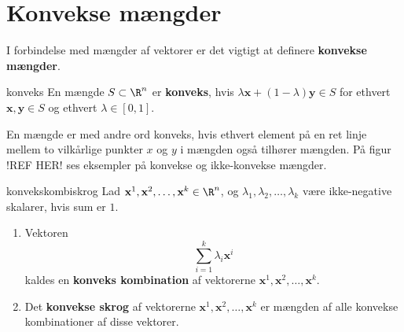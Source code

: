 \section{Konvekse mængder}
%
I forbindelse med mængder af vektorer er det vigtigt at definere \textbf{konvekse mængder}.
\begin{defn}{}{konveks}
En mængde $S \subset \R^n$ er \textbf{konveks}, hvis $\lambda \textbf{x} + (1- \lambda ) \textbf{y} \in S$ for ethvert $\textbf{x}, \textbf{y} \in S$ og ethvert $\lambda \in [0,1]$. 
\end{defn}
\noindent
%
En mængde er med andre ord konveks, hvis ethvert element på en ret linje mellem to vilkårlige punkter $x$ og $y$ i mængden også tilhører mængden. 
På figur !REF HER! ses eksempler på konvekse og ikke-konvekse mængder. 
%
\begin{figure}[h!]
  \centering
  \caption{}
  \label{fig:konveks}
\end{figure}
%
\begin{defn}{}{konvekskombiskrog}
Lad $\textbf{x}^1, \textbf{x}^2, \ldots, \textbf{x}^k \in \R^n$, og $\lambda_1, \lambda_2, \ldots, \lambda_k$ være ikke-negative skalarer, hvis sum er $1$. 
\begin{enumerate}[label=(\alph*)]
	\item Vektoren $$\sum_{i=1}^{k} \lambda_i \textbf{x}^i$$ kaldes en \textbf{konveks kombination} af vektorerne $\textbf{x}^1, \textbf{x}^2, \ldots, \textbf{x}^k$. 
	\item Det \textbf{konvekse skrog} af vektorerne $\textbf{x}^1, \textbf{x}^2, \ldots, \textbf{x}^k$ er mængden af alle konvekse kombinationer af disse vektorer. 
\end{enumerate}
\end{defn}
